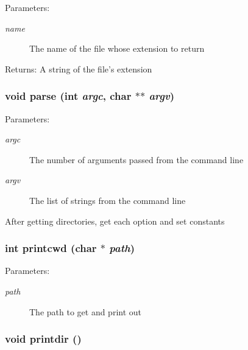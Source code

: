 \begin{Desc}
\item[Parameters:]
\begin{description}
\item[{\em name}]The name of the file whose extension to return \end{description}
\end{Desc}
\begin{Desc}
\item[Returns:]A string of the file's extension \end{Desc}
\subsubsection{\setlength{\rightskip}{0pt plus 5cm}void parse (int {\em argc}, char $\ast$$\ast$ {\em argv})}\label{dir_8h_66fa8f960eac1bf561ba2cb8be0cc58a}


\begin{Desc}
\item[Parameters:]
\begin{description}
\item[{\em argc}]The number of arguments passed from the command line \item[{\em argv}]The list of strings from the command line\end{description}
\end{Desc}
After getting directories, get each option and set constants 
\subsubsection{\setlength{\rightskip}{0pt plus 5cm}int printcwd (char $\ast$ {\em path})}\label{dir_8h_6d7841070d2de02a436b0c1ddd0a33f4}


\begin{Desc}
\item[Parameters:]
\begin{description}
\item[{\em path}]The path to get and print out \end{description}
\end{Desc}
\subsubsection{\setlength{\rightskip}{0pt plus 5cm}void printdir ()}\label{dir_8h_c92ccf131b6252a18153ea39ca6786ed}


